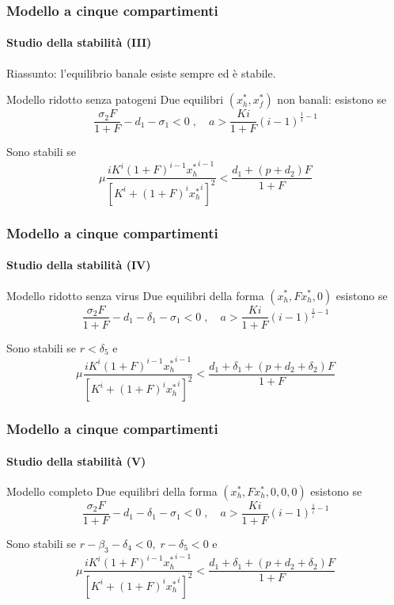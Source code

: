\documentclass[]{beamer} %
\begin{document}
\begin{frame}
    \frametitle{Modello a cinque compartimenti}
    \framesubtitle{Studio della stabilità (III)}

    Riassunto: l'equilibrio banale esiste sempre ed è stabile.


    \begin{block}{Modello ridotto senza patogeni}
        Due equilibri $(x_h^*, x_f^*)$ non banali: esistono se
        $$\frac{\sigma_2 F}{1+F} - d_1 - \sigma_1 <0 \; , \quad %
            a > \frac{Ki}{1+F} (i-1)^{\frac{1}{i} -1}$$

        \pause
        Sono stabili se
        $$\mu \frac{ i K^i (1+F)^{i-1}{x_h^*}^{i-1} }{ {\left[ K^i +(1+F)^i {x_h^*}^i \right]}^2 } %
            < \frac{d_1 + (p+d_2)F}{1+F}$$
    \end{block}
\end{frame}

\begin{frame}
    \frametitle{Modello a cinque compartimenti}
    \framesubtitle{Studio della stabilità (IV)}

    \begin{block}{Modello ridotto senza virus}
        Due equilibri della forma $(x_h^*, F x_h^*, 0)$ esistono se
        $$\frac{\sigma_2 F}{1+F} - d_1 -\delta_1 -\sigma_1 < 0 \; , \quad %
            a > \frac{Ki}{1+F} {(i-1)}^{\frac{1}{i} -1}$$

        \pause
        Sono stabili se $r < \delta_5$ e
        $$\mu \frac{ i K^i (1+F)^{i-1}{x_h^*}^{i-1} }{ {\left[ K^i +(1+F)^i {x_h^*}^i \right]}^2 }
            < \frac{d_1 + \delta_1 + (p+d_2+\delta_2)F}{1+F}$$
    \end{block}
\end{frame}

\begin{frame}
    \frametitle{Modello a cinque compartimenti}
    \framesubtitle{Studio della stabilità (V)}

    \begin{block}{Modello completo}
        Due equilibri della forma $(x_h^*, F x_h^*, 0, 0, 0)$ esistono se
        $$\frac{\sigma_2 F}{1+F} - d_1 -\delta_1 -\sigma_1 < 0 \; , \quad %
        a > \frac{Ki}{1+F} {(i-1)}^{\frac{1}{i} -1}$$

        \pause Sono stabili se $r - \beta_3 - \delta_4 < 0 , \; r - \delta_5 < 0$ e
        $$\mu \frac{ i K^i (1+F)^{i-1}{x_h^*}^{i-1} }{ {\left[ K^i +(1+F)^i {x_h^*}^i \right]}^2 }
            < \frac{d_1 + \delta_1 + (p+d_2+\delta_2)F}{1+F}$$
    \end{block}
\end{frame}
\end{document}
